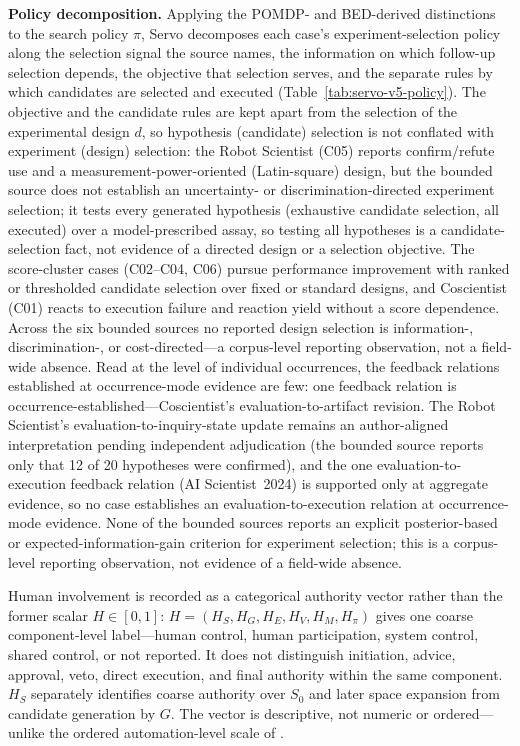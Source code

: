 \documentclass{article}
\begin{document}
\noindent\textbf{Policy decomposition.}
Applying the POMDP- and BED-derived distinctions to the search policy $\pi$, Servo decomposes
each case's experiment-selection policy along the selection signal the source names, the
information on which follow-up selection depends, the objective that selection serves, and the
separate rules by which candidates are selected and executed
(Table~\ref{tab:servo-v5-policy}). The objective and the candidate rules are kept apart from the selection of the experimental
design $d$, so hypothesis (candidate) selection is not conflated with experiment (design)
selection: the Robot Scientist (C05) reports confirm/refute use and a
measurement-power-oriented (Latin-square) design, but the bounded source does not establish an
uncertainty- or discrimination-directed experiment selection; it tests every generated hypothesis
(exhaustive candidate selection, all executed) over a model-prescribed assay, so testing all
hypotheses is a candidate-selection fact, not evidence of a directed design or a selection
objective. The score-cluster cases (C02--C04, C06) pursue
performance improvement with ranked or thresholded candidate selection over fixed or standard
designs, and Coscientist (C01) reacts to execution failure and reaction yield without a score
dependence. Across the six bounded sources no reported design selection is information-,
discrimination-, or cost-directed---a corpus-level reporting observation, not a field-wide absence. Read at the level of individual
occurrences, the feedback relations established at occurrence-mode evidence are few: one feedback relation
is occurrence-established---Coscientist's evaluation-to-artifact revision. The Robot Scientist's
evaluation-to-inquiry-state update remains an author-aligned interpretation pending independent
adjudication (the bounded source reports only that 12 of 20 hypotheses were confirmed), and the
one evaluation-to-execution feedback relation (AI Scientist~2024) is supported only at aggregate
evidence, so no case establishes an evaluation-to-execution relation at occurrence-mode evidence. None of the bounded sources reports an
explicit posterior-based or expected-information-gain criterion for experiment selection; this is
a corpus-level reporting observation, not evidence of a field-wide absence.

Human involvement is recorded as a categorical authority vector rather than the former scalar $H\in[0,1]$: $H=(H_S,H_G,H_E,H_V,H_M,H_\pi)$ gives one coarse component-level label---human control, human participation, system control, shared control, or not reported. It does not distinguish initiation, advice, approval, veto, direct execution, and final authority within the same component. $H_S$ separately identifies coarse authority over $S_0$ and later space expansion from candidate generation by $G$. The vector is descriptive, not numeric or ordered---unlike the ordered automation-level scale of \citet{parasuraman2000automation}.
\end{document}
